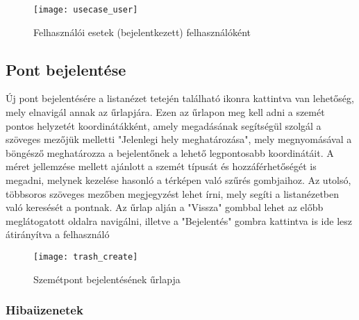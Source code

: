 \begin{figure}[H]
	\centering
	\texttt{[image: usecase\_user]}
	\caption{Felhasználói esetek (bejelentkezett) felhasználóként}
	\label{fig:usecase_user}
\end{figure}

\subsection{Pont bejelentése}
\label{subsec:trash_create}

Új pont bejelentésére a listanézet tetején található  ikonra kattintva van lehetőség, mely elnavigál annak az űrlapjára. Ezen az űrlapon meg kell adni a szemét pontos helyzetét koordinátákként, amely megadásának segítségül szolgál a szöveges mezőjük melletti "Jelenlegi hely meghatározása", mely megnyomásával a böngésző meghatározza a bejelentőnek a lehető legpontosabb koordinátáit. A méret jellemzése mellett ajánlott a szemét típusát és hozzáférhetőségét is megadni, melynek kezelése hasonló a térképen való szűrés gombjaihoz. Az utolsó, többsoros szöveges mezőben megjegyzést lehet írni, mely segíti a listanézetben való keresését a pontnak. Az űrlap alján a "Vissza" gombbal lehet az előbb meglátogatott oldalra navigálni, illetve a "Bejelentés" gombra kattintva is ide lesz átirányítva a felhasználó

\begin{figure}[H]
	\centering
	\texttt{[image: trash\_create]}
	\caption{Szemétpont bejelentésének űrlapja}
	\label{fig:trash_create}
\end{figure}

\subsubsection{Hibaüzenetek}
\label{subsubsec:trash_create_errors}

